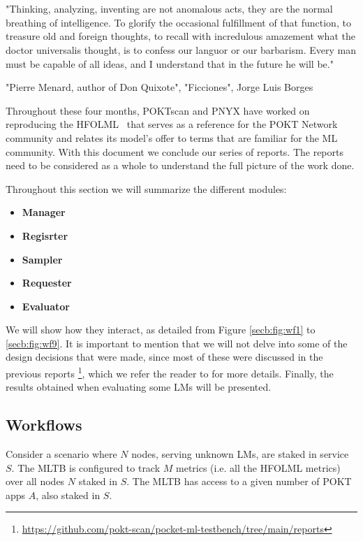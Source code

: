 \section{}\label{sec:b}
\setlength{\epigraphwidth}{\textwidth}
\epigraph{\small "Thinking, analyzing, inventing are not anomalous acts, they are the normal breathing of intelligence. 
To glorify the occasional fulfillment of that function, to treasure old and foreign thoughts, to recall with incredulous amazement what the doctor universalis thought, is to confess our languor or our barbarism. 
Every man must be capable of all ideas, and I understand that in the future he will be."}{"Pierre Menard, author of Don Quixote", "Ficciones", Jorge Luis Borges}

Throughout these four months, POKTscan and PNYX have worked on reproducing the \gls{HFOLML}~\cite{noauthor_open_nodate} that serves as a reference for the POKT Network community and relates its model's offer to terms that are familiar for the \gls{ML} community. 
With this document we conclude our series of reports. The reports need to be considered as a whole to understand the full picture of the work done.

Throughout this section we will summarize the different modules:

\begin{itemize}[noitemsep]
    \item \textbf{Manager}
    \item \textbf{Regisrter}
    \item \textbf{Sampler}
    \item \textbf{Requester}
    \item \textbf{Evaluator}
\end{itemize}

We will show how they interact, as detailed from Figure \ref{secb:fig:wf1} to \ref{secb:fig:wf9}. 
It is important to mention that we will not delve into some of the design decisions that were made, since most of these were discussed in the previous reports \footnote{\url{https://github.com/pokt-scan/pocket-ml-testbench/tree/main/reports}}, which we refer the reader to for more details. 
Finally, the results obtained when evaluating some \glspl{LM} will be presented.  

\subsection{Workflows}

Consider a scenario where $N$ nodes, serving unknown \glspl{LM}, are staked in service $S$. 
The \gls{MLTB} is configured to track $M$ metrics (i.e. all the \gls{HFOLML} metrics) over all nodes $N$ staked in $S$. 
The \gls{MLTB} has access to a given number of POKT apps $A$, also staked in $S$. 

